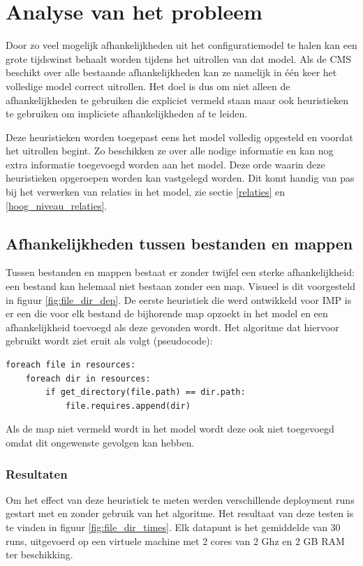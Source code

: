 \chapter{Analyse van het probleem}
\label{analyse}
Door zo veel mogelijk afhankelijkheden uit het configuratiemodel te halen kan een grote  tijdswinst behaalt worden tijdens het uitrollen van dat model.
Als de CMS beschikt over alle bestaande afhankelijkheden kan ze namelijk in \'e\'en keer het volledige model correct uitrollen.
Het doel is dus om niet alleen de afhankelijkheden te gebruiken die expliciet vermeld staan maar ook heuristieken te gebruiken om impliciete afhankelijkheden af te leiden.

Deze heuristieken worden toegepast eens het model volledig opgesteld en voordat het uitrollen begint.
Zo beschikken ze over alle nodige informatie en kan nog extra informatie toegevoegd worden aan het model.
Deze orde waarin deze heuristieken opgeroepen worden kan vastgelegd worden. Dit komt handig van pas bij het verwerken van relaties in het model, zie sectie \ref{relaties} en \ref{hoog_niveau_relaties}.

\section{Afhankelijkheden tussen bestanden en mappen}
\label{bestanden_en_mappen}
Tussen bestanden en mappen bestaat er zonder twijfel een sterke afhankelijkheid: een bestand kan helemaal niet bestaan zonder een map.
Visueel is dit voorgesteld in figuur \ref{fig:file_dir_dep}.
De eerste heuristiek die werd ontwikkeld voor IMP is er een die voor elk bestand de bijhorende map opzoekt in het model en een afhankelijkheid toevoegd als deze gevonden wordt.
Het algoritme dat hiervoor gebruikt wordt ziet eruit als volgt (pseudocode):

\begin{lstlisting}
foreach file in resources:
    foreach dir in resources:
        if get_directory(file.path) == dir.path:
            file.requires.append(dir)
\end{lstlisting}

Als de map niet vermeld wordt in het model wordt deze ook niet toegevoegd omdat dit ongewenste gevolgen kan hebben. 

\subsection{Resultaten}
\label{bestanden_en_mappen_res}
Om het effect van deze heuristiek te meten werden verschillende deployment runs gestart met en zonder gebruik van het algoritme.
Het resultaat van deze testen is te vinden in figuur \ref{fig:file_dir_times}.
Elk datapunt is het gemiddelde van 30 runs, uitgevoerd op een virtuele machine met 2 cores van 2 Ghz en 2 GB RAM ter beschikking.

